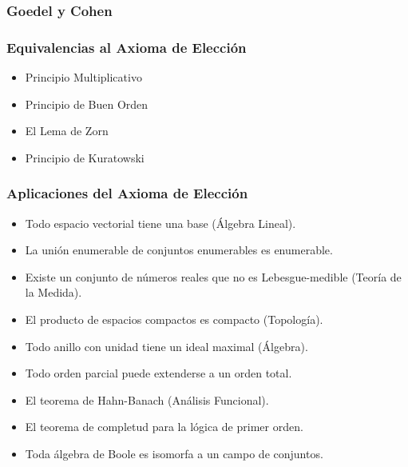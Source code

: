 
\begin{frame}
\frametitle{Goedel y Cohen}

\startchronology
[startyear=1930, stopyear=1965]
\stopchronology

\end{frame}


\begin{frame}
 \frametitle{Equivalencias al Axioma de Elección}
 
 \begin{itemize}
  \item Principio Multiplicativo
  \item Principio de Buen Orden
  \item El Lema de Zorn
  \item Principio de Kuratowski
 \end{itemize}
\end{frame}

\begin{frame}
 \frametitle{Aplicaciones del Axioma de Elección}
 
 \begin{itemize}
  \item Todo espacio vectorial tiene una base (Álgebra Lineal).
  \item La unión enumerable de conjuntos enumerables es enumerable.
  \item Existe un conjunto de números reales que no es Lebesgue-medible (Teoría de la Medida).
  \item El producto de espacios compactos es compacto (Topología).
  \item Todo anillo con unidad tiene un ideal maximal (Álgebra).
  \item Todo orden parcial puede extenderse a un orden total.
  \item El teorema de Hahn-Banach (Análisis Funcional).
  \item El teorema de completud para la lógica de primer orden.
  \item Toda álgebra de Boole es isomorfa a un campo de conjuntos.
 \end{itemize}
\end{frame}

